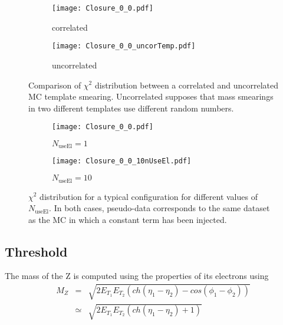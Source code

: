 \begin{figure}
\begin{subfigure}[t]{0.49\linewidth}
\begin{center}
\texttt{[image: Closure\_0\_0.pdf]}
\end{center}
\caption{correlated}
\end{subfigure}
\begin{subfigure}[t]{0.49\linewidth}
\begin{center}
\texttt{[image: Closure\_0\_0\_uncorTemp.pdf]}
\end{center}
\caption{uncorrelated}
\end{subfigure}
\caption{\label{orgff6a45b}
Comparison of $\chi^2$ distribution between a correlated and uncorrelated MC template smearing. Uncorrelated supposes that mass smearings in two different templates use different random numbers.}
\end{figure}



\begin{figure}
\begin{subfigure}[t]{0.49\linewidth}
\begin{center}
\texttt{[image: Closure\_0\_0.pdf]}
\end{center}
\caption{$N_\text{useEl}=1$}
\end{subfigure}
\begin{subfigure}[t]{0.49\linewidth}
\begin{center}
\texttt{[image: Closure\_0\_0\_10nUseEl.pdf]}
\end{center}
\caption{$N_\text{useEl}=10$}
\end{subfigure}
\caption{\label{org98e07ca}
$\chi^2$ distribution for a typical configuration for different values of $N_\text{useEl}$. In both cases, pseudo-data corresponds to the same dataset as the MC in which a constant term has been injected.}
\end{figure}


\subsection{Threshold}
\label{sec:org899f075}

The mass of the Z is computed using the properties of its electrons using
\begin{equation}
  \label{eq:org6d73873}
  \begin{array}{lcl}
    M_Z &=& \sqrt{2E_{T_1}E_{T_2}(ch(\eta_1-\eta_2) - cos(\phi_1-\phi_2) )} \\
            &\simeq &\sqrt{2E_{T_1}E_{T_2}(ch(\eta_1-\eta_2) +1 )}
    \end{array}
\end{equation}

